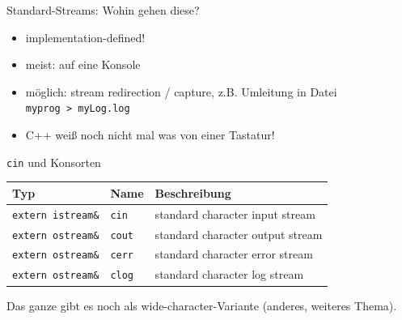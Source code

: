 
\begin{frame}{Standard-Streams: Wohin gehen diese?}
	\begin{itemize}
		\item implementation-defined!
		\item meist: auf eine Konsole
		\item möglich: stream redirection / capture, z.B. Umleitung in Datei \texttt{myprog~>~myLog.log}
		\item C++ weiß noch nicht mal was von einer Tastatur!
	\end{itemize}
\end{frame}

\begin{frame}{\texttt{cin} und Konsorten}
	\begin{tabular}{l|l|l}
		\textbf{Typ}	&	\textbf{Name}	& \textbf{Beschreibung}	\\
		\hline
		\texttt{extern istream\&}	&	\texttt{cin}	&	standard character input stream	\\
		\texttt{extern ostream\&}	&	\texttt{cout}	&	standard character output stream	\\
		\texttt{extern ostream\&}	&	\texttt{cerr}	&	standard character error stream	\\
		\texttt{extern ostream\&}	&	\texttt{clog}	&	standard character log stream	\\
	\end{tabular}
	
	\vspace{2em}
	
	Das ganze gibt es noch als wide-character-Variante (anderes, weiteres Thema).
\end{frame}
